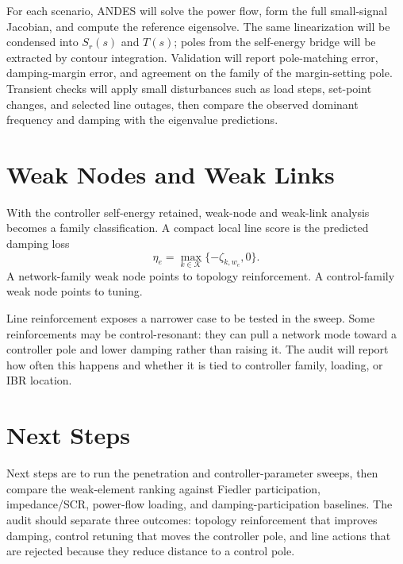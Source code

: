 \documentclass[conference,9pt]{IEEEtran}
\begin{document}
For each scenario, ANDES will solve the power flow, form the full small-signal Jacobian, and compute the reference eigensolve. The same linearization will be condensed into \(S_r(s)\) and \(T(s)\); poles from the self-energy bridge will be extracted by contour integration. Validation will report pole-matching error, damping-margin error, and agreement on the family of the margin-setting pole. Transient checks will apply small disturbances such as load steps, set-point changes, and selected line outages, then compare the observed dominant frequency and damping with the eigenvalue predictions.

\section{Weak Nodes and Weak Links}

With the controller self-energy retained, weak-node and weak-link analysis becomes a family classification. A compact local line score is the predicted damping loss
\[
\eta_e=\max_{k\in\mathcal K}\{-\zeta_{k,w_e},0\}.
\]
A network-family weak node points to topology reinforcement. A control-family weak node points to tuning.

Line reinforcement exposes a narrower case to be tested in the sweep. Some reinforcements may be control-resonant: they can pull a network mode toward a controller pole and lower damping rather than raising it. The audit will report how often this happens and whether it is tied to controller family, loading, or IBR location.

\section{Next Steps}

Next steps are to run the penetration and controller-parameter sweeps, then compare the weak-element ranking against Fiedler participation, impedance/SCR, power-flow loading, and damping-participation baselines. The audit should separate three outcomes: topology reinforcement that improves damping, control retuning that moves the controller pole, and line actions that are rejected because they reduce distance to a control pole.
\end{document}
